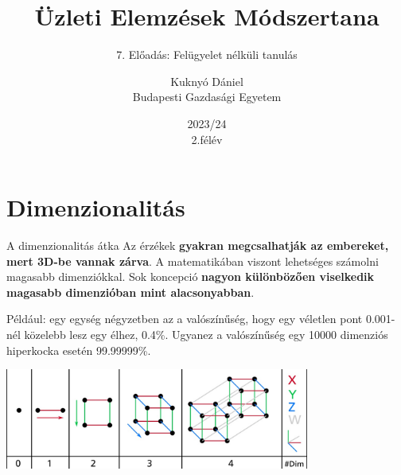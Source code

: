 \documentclass[english, aspectratio=169]{beamer}
\makeatletter
\newcommand\makebeamertitle{\frame{\maketitle}}
\let\origtableofcontents=\tableofcontents
\def\tableofcontents{\@ifnextchar[{\origtableofcontents}{\gobbletableofcontents}}
\def\gobbletableofcontents#1{\origtableofcontents}
\makeatother
\begin{document}
\section{Dimenzionalitás}
\title[]{Üzleti Elemzések Módszertana}
\subtitle{7. Előadás: Felügyelet nélküli tanulás}
\author[Kuknyó Dániel]{Kuknyó Dániel\\Budapesti Gazdasági Egyetem}
\date{2023/24\\2.félév}
\makebeamertitle

\begin{frame}
\tableofcontents{}
\end{frame}

\begin{frame}
\tableofcontents[currentsection]
\end{frame}

\begin{frame}{A dimenzionalitás átka}
Az érzékek \textbf{gyakran megcsalhatják az embereket, mert 3D-be vannak zárva}. A matematikában viszont lehetséges számolni magasabb dimenziókkal. Sok koncepció \textbf{nagyon különbözően viselkedik magasabb dimenzióban mint alacsonyabban}.\par\smallskip
Például: egy egység négyzetben az a valószínűség, hogy egy véletlen pont 0.001-nél közelebb lesz egy élhez, 0.4\%. Ugyanez a valószínűség egy 10000 dimenziós hiperkocka esetén 99.99999\%.
\begin{center}
\includegraphics[width=10cm, keepaspectratio]{images/unsupervised_1.png}
\end{center}
\end{frame}
\end{document}
